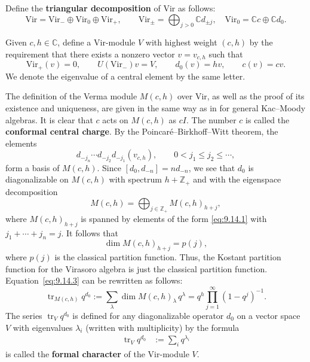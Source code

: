 \documentclass[12pt]{article}
\begin{document}
Define the \textbf{triangular decomposition} of $\mathrm{Vir}$ as follows:
\[
\mathrm{Vir} = \mathrm{Vir}_- \oplus \mathrm{Vir}_0 \oplus \mathrm{Vir}_+,
\qquad
\mathrm{Vir}_\pm = \bigoplus_{j>0} \mathbb{C} d_{\pm j}, \quad
\mathrm{Vir}_0 = \mathbb{C} c \oplus \mathbb{C} d_0.
\]

Given $c,h \in \mathbb{C}$, define a $\mathrm{Vir}$-module $V$ with highest
weight $(c,h)$ by the requirement that there exists a nonzero vector
$v = v_{c,h}$ such that
\[
\mathrm{Vir}_+(v) = 0, \qquad U(\mathrm{Vir}_-)v = V, \qquad
d_0(v) = h v, \qquad c(v) = c v.
\]
We denote the eigenvalue of a central element by the same letter.

The definition of the Verma module $M(c,h)$ over $\mathrm{Vir}$,
as well as the proof of its existence and uniqueness, are given in
the same way as in for general Kac--Moody algebras. It is clear that $c$ acts on $M(c,h)$ as $cI$. The number $c$ is called the \textbf{conformal central charge}.
By the Poincaré–Birkhoff–Witt theorem, the elements
\begin{equation}\label{eq:9.14.1}
d_{-j_n}\cdots d_{-j_2} d_{-j_1}(v_{c,h}),
\qquad 0 < j_1 \le j_2 \le \cdots,
\end{equation}
form a basis of $M(c,h)$. Since $[d_0,d_{-n}] = n d_{-n}$, we see
that $d_0$ is diagonalizable on $M(c,h)$ with spectrum
$h + \mathbb{Z}_+$ and with the eigenspace decomposition
\begin{equation}\label{eq:9.14.2}
M(c,h) = \bigoplus_{j \in \mathbb{Z}_+} M(c,h)_{h+j},
\end{equation}
where $M(c,h)_{h+j}$ is spanned by elements of the form
\eqref{eq:9.14.1} with $j_1 + \cdots + j_n = j$.
It follows that
\begin{equation}\label{eq:9.14.3}
\dim M(c,h)_{h+j} = p(j),
\end{equation}
where $p(j)$ is the classical partition function. Thus, the Kostant
partition function for the Virasoro algebra is just the classical
partition function.
Equation~\eqref{eq:9.14.3} can be rewritten as follows:
\[
\operatorname{tr}_{M(c,h)} q^{d_0}
:= \sum_\lambda \dim M(c,h)_\lambda\, q^\lambda
= q^h \prod_{j=1}^\infty (1 - q^j)^{-1}.
\]
The series $\operatorname{tr}_V q^{d_0}$ is defined for any diagonalizable operator $d_0$ on a vector space $V$ with eigenvalues $\lambda_i$ (written with multiplicity) by the formula
\begin{align*}
\operatorname{tr}_V q^{d_0}
&:= \sum_i q^{\lambda_i}
\end{align*}
is called the
\textbf{formal character} of the $\mathrm{Vir}$-module $V$.
\end{document}
